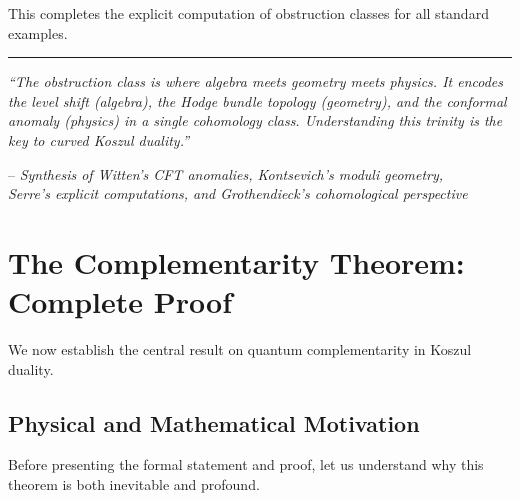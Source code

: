 This completes the explicit computation of obstruction classes for all standard examples.

\begin{center}
\rule{0.5\textwidth}{0.4pt}

\textit{``The obstruction class is where algebra meets geometry meets physics. 
It encodes the level shift (algebra), the Hodge bundle topology (geometry), and 
the conformal anomaly (physics) in a single cohomology class. Understanding this 
trinity is the key to curved Koszul duality.''}

-- \textit{Synthesis of Witten's CFT anomalies, Kontsevich's moduli geometry, \\
Serre's explicit computations, and Grothendieck's cohomological perspective}
\end{center}


\section{The Complementarity Theorem: Complete Proof}
\label{sec:complementarity-theorem}

We now establish the central result on quantum complementarity in Koszul duality.

\subsection{Physical and Mathematical Motivation}

Before presenting the formal statement and proof, let us understand why this theorem
is both inevitable and profound.

